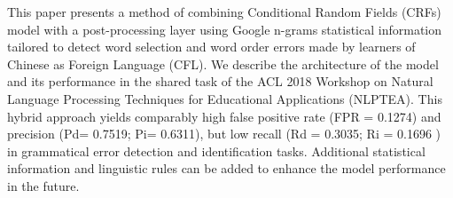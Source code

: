 This paper presents a method of combining Conditional Random Fields (CRFs) model with a post-processing layer using Google n-grams statistical information tailored to detect word selection and word order errors made by learners of Chinese as Foreign Language (CFL). We describe the architecture of the model and its performance in the shared task of the ACL 2018 Workshop on Natural Language Processing Techniques for Educational Applications (NLPTEA). This hybrid approach yields comparably high false positive rate (FPR = 0.1274) and precision (Pd= 0.7519; Pi= 0.6311), but low recall (Rd = 0.3035; Ri = 0.1696 ) in grammatical error detection and identification tasks. Additional statistical information and linguistic rules can be added to enhance the model performance in the future.
